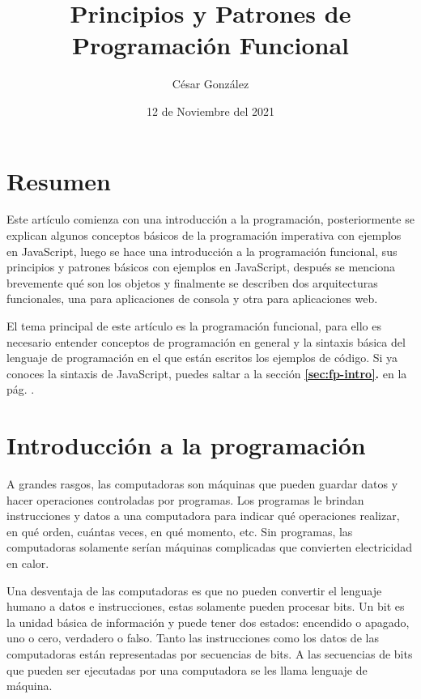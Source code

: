 \documentclass{article}
\begin{document}
\title{\Large{\textbf{Principios y Patrones de Programación Funcional}}}
\author{César González}
\date{12 de Noviembre del 2021}
\maketitle


\pagebreak
\section*{Resumen}
Este artículo comienza con una introducción a la programación, posteriormente se explican algunos conceptos básicos de la programación imperativa con ejemplos en JavaScript, luego se hace una introducción a la programación funcional, sus principios y patrones básicos con ejemplos en JavaScript, después se menciona brevemente qué son los objetos y finalmente se describen dos arquitecturas funcionales, una para aplicaciones de consola y otra para aplicaciones web.

El tema principal de este artículo es la programación funcional, para ello es necesario entender conceptos de programación en general y la sintaxis básica del lenguaje de programación en el que están escritos los ejemplos de código. Si ya conoces la sintaxis de JavaScript, puedes saltar a la sección \textbf{\ref{sec:fp-intro}. } en la pág. \pageref{sec:fp-intro}.

\section{Introducción a la programación}
A grandes rasgos, las computadoras son máquinas que pueden guardar datos y hacer operaciones controladas por programas. Los programas le brindan instrucciones y datos a una computadora para indicar qué operaciones realizar, en qué orden, cuántas veces, en qué momento, etc. Sin programas, las computadoras solamente serían máquinas complicadas que convierten electricidad en calor.

Una desventaja de las computadoras es que no pueden convertir el lenguaje humano a datos e instrucciones, estas solamente pueden procesar bits. Un bit es la unidad básica de información y puede tener dos estados: encendido o apagado, uno o cero, verdadero o falso. Tanto las instrucciones como los datos de las computadoras están representadas por secuencias de bits. A las secuencias de bits que pueden ser ejecutadas por una computadora se les llama lenguaje de máquina.
\end{document}
